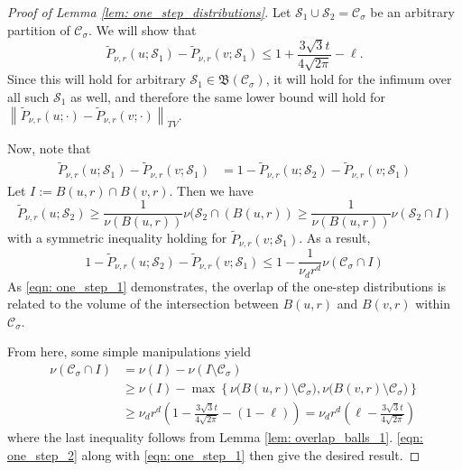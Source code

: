\documentclass{article}
\newcommand{\set}[1]{\left\{#1\right\}}
\newcommand{\norm}[1]{\left\lVert#1\right\rVert}
\newcommand{\1}{\mathbf{1}}
\newcommand{\Sset}{\mathcal{S}}
\newcommand{\Cset}{\mathcal{C}}
\newcommand{\Csig}{\Cset_{\sigma}}
\theoremstyle{aldenthm}
\theoremstyle{aldenrmrk}
\begin{document}
\begin{proof}[Proof of Lemma \ref{lem: one_step_distributions}]
	Let $\Sset_1 \cup \Sset_2 = \Csig$ be an arbitrary partition of $\Csig$. We will show that 
	\begin{equation*}
	\widetilde{P}_{\nu,r}(u; \Sset_1) - \widetilde{P}_{\nu,r}(v; \Sset_1) \leq 1 + \frac{3 \sqrt{3} t}{4\sqrt{2\pi}} - \ell.
	\end{equation*}
	Since this will hold for arbitrary $\Sset_1 \in \mathfrak{B}(\Csig)$, it will hold for the infimum over all such $\Sset_1$ as well, and therefore the same lower bound will hold for $\norm{\widetilde{P}_{\nu,r}(u; \cdot) - \widetilde{P}_{\nu,r}(v; \cdot)}_{TV}$.
	
	Now, note that
	\begin{align*}
	\widetilde{P}_{\nu,r}(u; \Sset_1) - \widetilde{P}_{\nu,r}(v; \Sset_1) & = 1 - \widetilde{P}_{\nu,r}(u; \Sset_2) - \widetilde{P}_{\nu,r}(v; \Sset_1)
	\end{align*}
	Let $I := B(u,r) \cap B(v,r)$. Then we have
	\begin{equation*}
	\widetilde{P}_{\nu,r}(u; \Sset_2) \geq \frac{1}{\nu(B(u,r))} \nu(\Sset_2 \cap (B(u,r)) \geq \frac{1}{\nu(B(u,r))} \nu(\Sset_2 \cap I)
	\end{equation*}
	with a symmetric inequality holding for $\widetilde{P}_{\nu,r}(v; \Sset_1)$. As a result,
	\begin{equation}
	1 - \widetilde{P}_{\nu,r}(u; \Sset_2) - \widetilde{P}_{\nu,r}(v; \Sset_1) \leq 1 - \frac{1}{\nu_d r^d} \nu(\Csig \cap I) \label{eqn: one_step_1}
	\end{equation}
	As \eqref{eqn: one_step_1} demonstrates, the overlap of the one-step distributions is related to the volume of the intersection between $B(u,r)$ and $B(v,r)$ within $\Csig$.
	
	From here, some simple manipulations yield
	\begin{align}
	\nu(\Csig \cap I)  & = \nu(I) - \nu(I \setminus \Csig) \nonumber \\
	& \geq \nu(I) - \max \set{\nu\bigl(B(u,r) \setminus \Csig\bigr), \nu\bigl(B(v,r) \setminus \Csig\bigr)} \nonumber \\
	& \geq \nu_d r^d \left(1 - \frac{3 \sqrt{3} t}{4\sqrt{2\pi}} - (1 -\ell) \label{eqn: one_step_2} \right) = \nu_d r^d\left(\ell - \frac{3 \sqrt{3} t}{4\sqrt{2\pi}}\right)
	\end{align}
	where the last inequality follows from Lemma \ref{lem: overlap_balls_1}. \eqref{eqn: one_step_2} along with \eqref{eqn: one_step_1} then give the desired result.
\end{proof}
\end{document}
